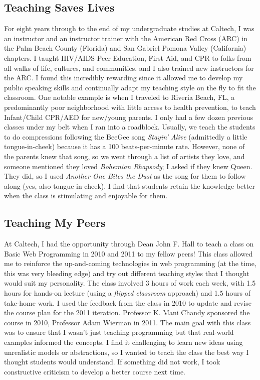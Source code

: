 \subsection{Teaching Saves Lives} \label{ssec:teaching-saves-lives}
For eight years through to the end of my undergraduate studies at Caltech, I was an instructor and an instructor trainer with the American Red Cross (ARC) in the Palm Beach County (Florida) and San Gabriel Pomona Valley (California) chapters. I taught HIV/AIDS Peer Education, First Aid, and CPR to folks from all walks of life, cultures, and communities, and I also trained new instructors for the ARC. I found this incredibly rewarding since it allowed me to develop my public speaking skills and continually adapt my teaching style on the fly to fit the classroom. One notable example is when I traveled to Riveria Beach, FL, a predominantly poor neighborhood with little access to health prevention, to teach Infant/Child CPR/AED for new/young parents. I only had a few dozen previous classes under my belt when I ran into a roadblock. Usually, we teach the students to do compressions following the BeeGee song \textsl{Stayin' Alive} (admittedly a little tongue-in-cheek) because it has a 100 beats-per-minute rate. However, none of the parents knew that song, so we went through a list of artists they love, and someone mentioned they loved \textsl{Bohemian Rhapsody}; I asked if they knew Queen. They did, so I used \textsl{Another One Bites the Dust} as the song for them to follow along (yes, also tongue-in-cheek). I find that students retain the knowledge better when the class is stimulating and enjoyable for them.

\subsection{Teaching My Peers} \label{ssec:teaching-my-peers}
At Caltech, I had the opportunity through Dean John F. Hall to teach a class on Basic Web Programming in 2010 and 2011 to my fellow peers! This class allowed me to reinforce the up-and-coming technologies in web programming (at the time, this was very bleeding edge) and try out different teaching styles that I thought would suit my personality. The class involved 3 hours of work each week, with 1.5 hours for hands-on lecture (using a \textsl{flipped classroom} approach) and 1.5 hours of take-home work. I used the feedback from the class in 2010 to update and revise the course plan for the 2011 iteration. Professor K. Mani Chandy sponsored the course in 2010, Professor Adam Wierman in 2011. The main goal with this class was to ensure that I wasn't just teaching programming but that real-world examples informed the concepts. I find it challenging to learn new ideas using unrealistic models or abstractions, so I wanted to teach the class the best way I thought students would understand. If something did not work, I took constructive criticism to develop a better course next time.

